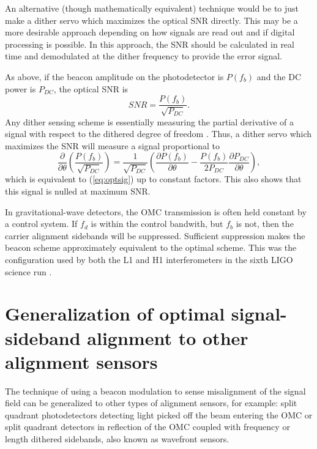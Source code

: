 An alternative (though mathematically equivalent) technique would be to just make a dither servo which maximizes the optical SNR directly. %
This may be a more desirable approach depending on how signals are read out and if digital processing is possible. %
In this approach, the SNR should be calculated in real time and demodulated at the dither frequency to provide the error signal.

As above, if the beacon amplitude on the photodetector is $P(f_b)$ and the DC power is $P_{DC}$, the optical SNR is
%
\begin{equation}
SNR = \frac{P(f_b)}{\sqrt{P_{DC}}}.
\end{equation}
%
Any dither sensing scheme is essentially measuring the partial derivative of a signal with respect to the dithered degree of freedom \cite{Kawabe:94}. %
Thus, a dither servo which maximizes the SNR will measure a signal proportional to
%
\begin{equation}
\frac{\partial}{\partial \theta} \left( \frac{P(f_b)}{\sqrt {P_{DC}} } \right) = \frac{1}{\sqrt {P_{DC}}} \left( \frac{\partial P(f_b)}{\partial \theta} - \frac{P(f_b)}{2P_{DC}} \frac{\partial P_{DC}}{\partial \theta} \right),
\end{equation}
%
which is equivalent to (\ref{eq:optsig}) up to constant factors. %
This also shows that this signal is nulled at maximum SNR.

In gravitational-wave detectors, the OMC transmission is often held constant by a control system. %
If $f_d$ is within the control bandwith, but $f_b$ is not, then the carrier alignment sidebands will be suppressed. %
Sufficient suppression makes the beacon scheme approximately equivalent to the optimal scheme. %
This was the configuration used by both the L1 and H1 interferometers in the sixth LIGO science run \cite{Tobin}.

\section{Generalization of optimal signal-sideband alignment to other alignment sensors}

The technique of using a beacon modulation to sense misalignment of the signal field can be generalized to other types of alignment sensors, for example: split quadrant photodetectors detecting light picked off the beam entering the OMC or split quadrant detectors in reflection of the OMC coupled with frequency or length dithered sidebands, also known as wavefront sensors.

